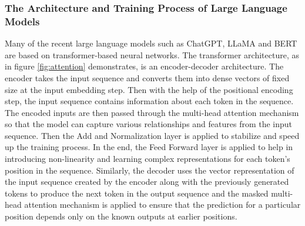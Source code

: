 \documentclass[runningheads]{llncs}
\begin{document}
\subsubsection{The Architecture and Training Process of Large Language Models}
\noindent \newline
Many of the recent large language models such as ChatGPT, LLaMA and BERT are based on transformer-based neural networks. The transformer architecture, as \cite{Vaswani17} in figure \ref{fig:attention} demonstrates, is an 
encoder-decoder architecture. The encoder takes the input sequence and converts them into dense vectors of fixed size at the input embedding step. Then with the 
help of the positional encoding step, the input sequence contains information about each token in the sequence. The encoded inputs are then passed through the multi-head attention mechanism so that the 
model can capture various relationships and features from the input sequence. Then the Add and Normalization layer is applied to stabilize and speed up the training process. In the end, the Feed Forward layer is 
applied to help in introducing non-linearity and learning complex representations for each token's position in the sequence. Similarly, the decoder uses the vector representation of the input sequence created
by the encoder along with the previously generated tokens to produce the next token in the output sequence and the masked multi-head attention mechanism is applied to ensure that the prediction for a particular position depends only on the known outputs at earlier positions. \\
\end{document}
